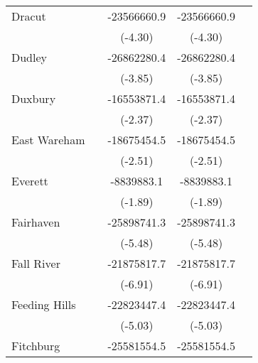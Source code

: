 {\begin{tabular}{l*{4}{c}}
\addlinespace
Dracut              &                     & -23566660.9\sym{***}& -23566660.9\sym{***}&                     \\
                    &                     &     (-4.30)         &     (-4.30)         &                     \\
\addlinespace
Dudley              &                     & -26862280.4\sym{***}& -26862280.4\sym{***}&                     \\
                    &                     &     (-3.85)         &     (-3.85)         &                     \\
\addlinespace
Duxbury             &                     & -16553871.4\sym{*}  & -16553871.4\sym{*}  &                     \\
                    &                     &     (-2.37)         &     (-2.37)         &                     \\
\addlinespace
East Wareham        &                     & -18675454.5\sym{*}  & -18675454.5\sym{*}  &                     \\
                    &                     &     (-2.51)         &     (-2.51)         &                     \\
\addlinespace
Everett             &                     &  -8839883.1         &  -8839883.1         &                     \\
                    &                     &     (-1.89)         &     (-1.89)         &                     \\
\addlinespace
Fairhaven           &                     & -25898741.3\sym{***}& -25898741.3\sym{***}&                     \\
                    &                     &     (-5.48)         &     (-5.48)         &                     \\
\addlinespace
Fall River          &                     & -21875817.7\sym{***}& -21875817.7\sym{***}&                     \\
                    &                     &     (-6.91)         &     (-6.91)         &                     \\
\addlinespace
Feeding Hills       &                     & -22823447.4\sym{***}& -22823447.4\sym{***}&                     \\
                    &                     &     (-5.03)         &     (-5.03)         &                     \\
\addlinespace
Fitchburg           &                     & -25581554.5\sym{***}& -25581554.5\sym{***}&                     \\

\end{tabular}}

